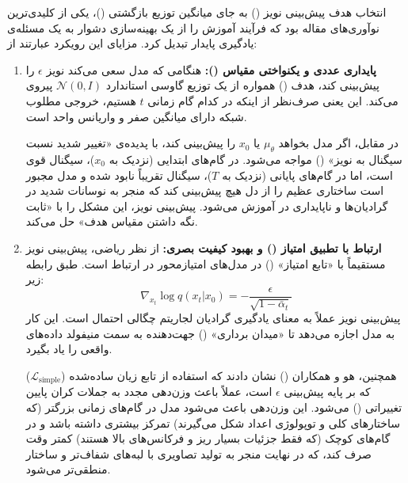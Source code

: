 \begin{solutionbox}
    انتخاب هدف پیش‌بینی نویز () به جای میانگین توزیع بازگشتی ()، یکی از کلیدی‌ترین نوآوری‌های مقاله  بود که فرآیند آموزش را از یک بهینه‌سازی دشوار به یک مسئله‌ی یادگیری پایدار تبدیل کرد. مزایای این رویکرد عبارتند از:

    \begin{enumerate}
        \item \textbf{پایداری عددی و یکنواختی مقیاس ():}
        هنگامی که مدل سعی می‌کند نویز $\epsilon$ را پیش‌بینی کند، هدف () همواره از یک توزیع گاوسی استاندارد $\mathcal{N}(0, I)$ پیروی می‌کند. این یعنی صرف‌نظر از اینکه در کدام گام زمانی $t$ هستیم، خروجی مطلوب شبکه دارای میانگین صفر و واریانس واحد است. 
        
        در مقابل، اگر مدل بخواهد $\mu_\theta$ یا $x_0$ را پیش‌بینی کند، با پدیده‌ی «تغییر شدید نسبت سیگنال به نویز» () مواجه می‌شود. در گام‌های ابتدایی (نزدیک به $x_0$)، سیگنال قوی است، اما در گام‌های پایانی (نزدیک به $T$)، سیگنال تقریباً نابود شده و مدل مجبور است ساختاری عظیم را از دل هیچ پیش‌بینی کند که منجر به نوسانات شدید در گرادیان‌ها و ناپایداری در آموزش می‌شود. پیش‌بینی نویز، این مشکل را با «ثابت نگه داشتن مقیاس هدف» حل می‌کند.

        \item \textbf{ارتباط با تطبیق امتیاز () و بهبود کیفیت بصری:}
        از نظر ریاضی، پیش‌بینی نویز مستقیماً با «تابع امتیاز» () در مدل‌های امتیاز‌محور در ارتباط است. طبق رابطه زیر:
        \begin{equation}
            \nabla_{x_t} \log q(x_t | x_0) = -\frac{\epsilon}{\sqrt{1 - \bar{\alpha}_t}}
        \end{equation}
        پیش‌بینی نویز عملاً به معنای یادگیری گرادیان لجاریتم چگالی احتمال است. این کار به مدل اجازه می‌دهد تا «میدان برداری» () جهت‌دهنده به سمت منیفولد داده‌های واقعی را یاد بگیرد.
        
        همچنین، هو و همکاران () نشان دادند که استفاده از تابع زیان ساده‌شده ($\mathcal{L}_{\text{simple}}$) که بر پایه پیش‌بینی $\epsilon$ است، عملاً باعث وزن‌دهی مجدد به جملات کران پایین تغییراتی () می‌شود. این وزن‌دهی باعث می‌شود مدل در گام‌های زمانی بزرگتر (که ساختارهای کلی و توپولوژی اعداد شکل می‌گیرند) تمرکز بیشتری داشته باشد و در گام‌های کوچک (که فقط جزئیات بسیار ریز و فرکانس‌های بالا هستند) کمتر وقت صرف کند، که در نهایت منجر به تولید تصاویری با لبه‌های شفاف‌تر و ساختار منطقی‌تر می‌شود.
    \end{enumerate}
\end{solutionbox}


